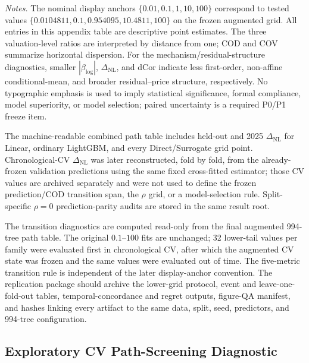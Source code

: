 \documentclass[10pt]{article}
\theoremstyle{definition}
\newcommand{\1}{\mathbf{1}}
\begin{document}
\begin{table}[!htbp]
\vspace{1mm}
\begin{minipage}{\textwidth}
\scriptsize
\emph{Notes.}
The nominal display anchors $\{0.01,0.1,1,10,100\}$ correspond to tested values $\{0.0104811,0.1,0.954095,10.4811,100\}$ on the frozen augmented grid.
All entries in this appendix table are descriptive point estimates. The three valuation-level ratios are interpreted by distance from one; COD and COV summarize horizontal dispersion. For the mechanism/residual-structure diagnostics, smaller $|\beta_{\log}|$, $\Delta_{\mathrm{NL}}$, and dCor indicate less first-order, non-affine conditional-mean, and broader residual--price structure, respectively. No typographic emphasis is used to imply statistical significance, formal compliance, model superiority, or model selection; paired uncertainty is a required P0/P1 freeze item.
\end{minipage}
\end{table}


The machine-readable combined path table includes held-out and 2025 $\Delta_{\mathrm{NL}}$ for Linear, ordinary LightGBM, and every Direct/Surrogate grid point. Chronological-CV $\Delta_{\mathrm{NL}}$ was later reconstructed, fold by fold, from the already-frozen validation predictions using the same fixed cross-fitted estimator; those CV values are archived separately and were not used to define the frozen prediction/COD transition span, the $\rho$ grid, or a model-selection rule. Split-specific $\rho=0$ prediction-parity audits are stored in the same result root.


The transition diagnostics are computed read-only from the final augmented 994-tree path table. The original $0.1$--$100$ fits are unchanged; 32 lower-tail values per family were evaluated first in chronological CV, after which the augmented CV state was frozen and the same values were evaluated out of time. The five-metric transition rule is independent of the later display-anchor convention. The replication package should archive the lower-grid protocol, event and leave-one-fold-out tables, temporal-concordance and regret outputs, figure-QA manifest, and hashes linking every artifact to the same data, split, seed, predictors, and 994-tree configuration.

\subsection{Exploratory CV Path-Screening Diagnostic}
\label{subsec:candidate_screen_appendix}
\end{document}

